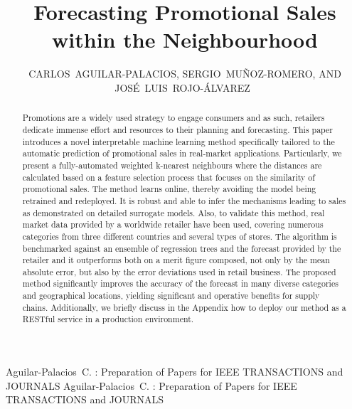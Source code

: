 \documentclass{ieeeaccess}
\begin{document}

\title{Forecasting Promotional Sales within the Neighbourhood}

\author{\uppercase{{Carlos}~Aguilar-Palacios},
\uppercase{Sergio~Mu\~noz-Romero},
\uppercase{and Jos\'e~Luis~Rojo-\'Alvarez}~}

\address[1]{Department of Signal Theory and Communications, Telematics and Computing Systems, Universidad Rey Juan Carlos, Madrid}
\address[2]{Center for Computational Simulation; Universidad Polit\'ecnica de Madrid, Madrid}


\markboth
{Aguilar-Palacios~C. \headeretal: Preparation of Papers for IEEE TRANSACTIONS and JOURNALS}
{Aguilar-Palacios~C. \headeretal: Preparation of Papers for IEEE TRANSACTIONS and JOURNALS}


\begin{abstract}
Promotions are a widely used strategy to engage consumers and as such, retailers dedicate immense effort and resources to their planning and forecasting. This paper introduces a novel interpretable machine learning method specifically tailored to the automatic prediction of promotional sales in real-market applications. Particularly, we present a fully-automated weighted k-nearest neighbours where the distances are calculated based on a feature selection process that focuses on the similarity of promotional sales. The method learns online, thereby avoiding the model being retrained and redeployed. It is robust and able to infer the mechanisms leading to sales as demonstrated on detailed surrogate models. Also, to validate this method, real market data provided by a worldwide retailer have been used, covering numerous categories from three different countries and several types of stores. The algorithm is benchmarked against an ensemble of regression trees and the forecast provided by the retailer and it outperforms both on a merit figure composed, not only by the mean absolute error, but also by the error deviations used in retail business.
The proposed method significantly improves the accuracy of the forecast in many diverse categories and geographical locations, yielding significant and operative benefits for supply chains. Additionally, we briefly discuss in the Appendix how to deploy our method as a RESTful service in a production environment.
\end{abstract}
\end{document}
